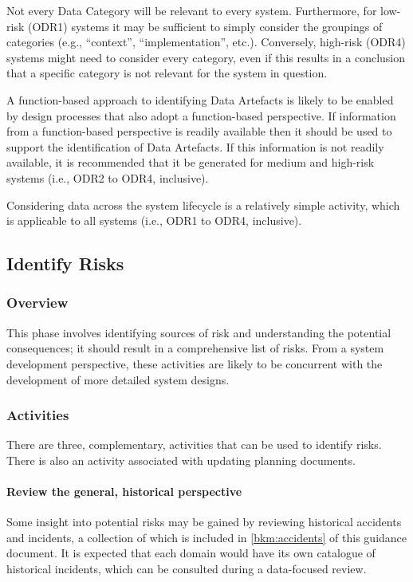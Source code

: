 Not every Data Category will be relevant to every system. Furthermore, for low-risk (ODR1) systems it may be sufficient to simply consider the groupings of categories (e.g., ``context'', ``implementation'', etc.). Conversely, high-risk (ODR4) systems might need to consider every category, even if this results in a conclusion that a specific category is not relevant for the system in question.

A function-based approach to identifying Data Artefacts is likely to be enabled by design processes that also adopt a function-based perspective. If information from a function-based perspective is readily available then it should be used to support the identification of Data Artefacts. If this information is not readily available, it is recommended that it be generated for medium and high-risk systems (i.e., ODR2 to ODR4, inclusive).

Considering data across the system lifecycle is a relatively simple activity, which is applicable to all systems (i.e., ODR1 to ODR4, inclusive).

\subsection{Identify Risks}
\subsubsection{Overview}
This phase involves identifying sources of risk and understanding the potential consequences; it should result in a comprehensive list of risks. From a system development perspective, these activities are likely to be concurrent with the development of more detailed system designs.

\subsubsection{Activities}
There are three, complementary, activities that can be used to identify risks. There is also an activity associated with updating planning documents.

\paragraph{Review the general, historical perspective}
Some insight into potential risks may be gained by reviewing historical accidents and incidents, a collection of which is included in
\autoref{bkm:accidents} of this guidance document. It is expected that each domain would have its own catalogue of historical incidents, which can be consulted during a data-focused review.

